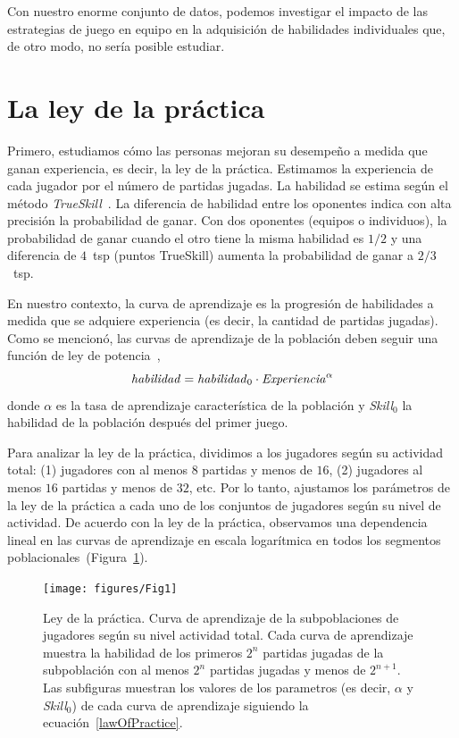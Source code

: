 \documentclass[a4paper,11pt]{book}
\theoremstyle{definition}
\begin{document}

Con nuestro enorme conjunto de datos, podemos investigar el impacto de las estrategias de juego en equipo en la adquisici\'on de habilidades individuales que, de otro modo, no ser\'ia posible estudiar.

\section{La ley de la pr\'actica}

Primero, estudiamos c\'omo las personas mejoran su desempe\~no a medida que ganan experiencia, es decir, la ley de la pr\'actica.
%
Estimamos la experiencia de cada jugador por el n\'umero de partidas jugadas.
%
La habilidad se estima seg\'un el m\'etodo \emph{TrueSkill}~\cite{Herbrich2007}.
%
La diferencia de habilidad entre los oponentes indica con alta precisi\'on la probabilidad de ganar.
%
Con dos oponentes (equipos o individuos), la probabilidad de ganar cuando el otro tiene la misma habilidad es $1/2$ y una diferencia de $4$~tsp (puntos TrueSkill) aumenta la probabilidad de ganar a $2/3$~tsp.


En nuestro contexto, la curva de aprendizaje es la progresi\'on de habilidades a medida que se adquiere experiencia (es decir, la cantidad de partidas jugadas).
%
Como se mencion\'o, las curvas de aprendizaje de la poblaci\'on deben seguir una funci\'on de ley de potencia~\cite{Newell1981},
%
\begin{equation}\label{lawOfPractice}
   \text{\emph{habilidad}} = \text{\emph{habilidad}}_0 \cdot \text{\emph{Experiencia}}^{\alpha}
\end{equation}
%
donde $\alpha$ es la tasa de aprendizaje caracter\'istica de la poblaci\'on y \emph{Skill}$_0$ la habilidad de la poblaci\'on despu\'es del primer juego.


Para analizar la ley de la pr\'actica, dividimos a los jugadores seg\'un su actividad total: (1) jugadores con al menos $8$ partidas y menos de $16$, (2) jugadores al menos $16$ partidas y menos de $32$, etc.
%
Por lo tanto, ajustamos los par\'ametros de la ley de la pr\'actica a cada uno de los conjuntos de jugadores seg\'un su nivel de actividad.
%
De acuerdo con la ley de la pr\'actica, observamos una dependencia lineal en las curvas de aprendizaje en escala logar\'itmica en todos los segmentos poblacionales~(Figura~\ref{learningskill_curve}).

\begin{figure}[ht!]
\centering
\texttt{[image: figures/Fig1]}
\caption{
Ley de la pr\'actica.
%
Curva de aprendizaje de la subpoblaciones de jugadores seg\'un su nivel actividad total.
%
Cada curva de aprendizaje muestra la habilidad de los primeros $2^n$ partidas jugadas de la subpoblaci\'on con al menos $2^n$ partidas jugadas y menos de $2^{n+1}$.
%
Las subfiguras muestran los valores de los parametros (es decir, $\alpha$ y \emph{Skill}$_0$) de cada curva de aprendizaje siguiendo la ecuaci\'on~\ref{lawOfPractice}.
}
\label{learningskill_curve}
\end{figure}
\end{document}
